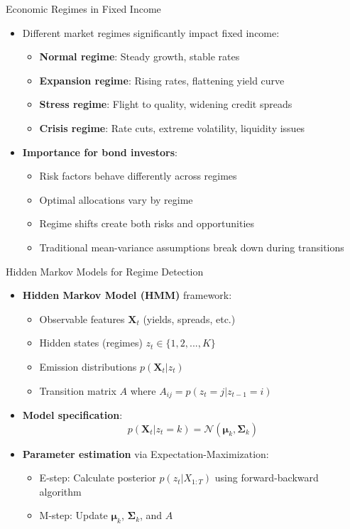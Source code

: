 \documentclass{beamer}
\begin{document}
\begin{frame}{Economic Regimes in Fixed Income}
\begin{itemize}
    \item Different market regimes significantly impact fixed income:
    \begin{itemize}
        \item \textbf{Normal regime}: Steady growth, stable rates
        \item \textbf{Expansion regime}: Rising rates, flattening yield curve
        \item \textbf{Stress regime}: Flight to quality, widening credit spreads
        \item \textbf{Crisis regime}: Rate cuts, extreme volatility, liquidity issues
    \end{itemize}
    \item \textbf{Importance for bond investors}:
    \begin{itemize}
        \item Risk factors behave differently across regimes
        \item Optimal allocations vary by regime
        \item Regime shifts create both risks and opportunities
        \item Traditional mean-variance assumptions break down during transitions
    \end{itemize}
\end{itemize}
\end{frame}

\begin{frame}{Hidden Markov Models for Regime Detection}
\begin{itemize}
    \item \textbf{Hidden Markov Model (HMM)} framework:
    \begin{itemize}
        \item Observable features $\mathbf{X}_t$ (yields, spreads, etc.)
        \item Hidden states (regimes) $z_t \in \{1,2,...,K\}$
        \item Emission distributions $p(\mathbf{X}_t|z_t)$
        \item Transition matrix $A$ where $A_{ij} = p(z_t=j|z_{t-1}=i)$
    \end{itemize}
    \item \textbf{Model specification}:
    \begin{equation}
    p(\mathbf{X}_t|z_t=k) = \mathcal{N}(\boldsymbol{\mu}_k, \boldsymbol{\Sigma}_k)
    \end{equation}
    \item \textbf{Parameter estimation} via Expectation-Maximization:
    \begin{itemize}
        \item E-step: Calculate posterior $p(z_t|X_{1:T})$ using forward-backward algorithm
        \item M-step: Update $\boldsymbol{\mu}_k$, $\boldsymbol{\Sigma}_k$, and $A$
    \end{itemize}
\end{itemize}
\end{frame}
\end{document}
